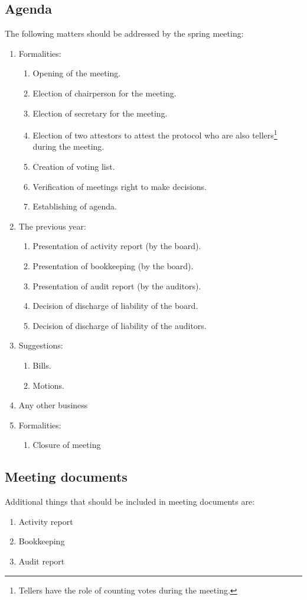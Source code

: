 \subsection{Agenda}
The following matters should be addressed by the spring meeting:
\begin{enumerate}
  \item Formalities:
  \begin{enumerate}
    \item Opening of the meeting.
    \item Election of chairperson for the meeting.
    \item Election of secretary for the meeting.
    \item Election of two attestors to attest the protocol who are also tellers\footnote{Tellers have the role of counting votes during the meeting.} during the meeting.
    \item Creation of voting list.
    \item Verification of meetings right to make decisions.
    \item Establishing of agenda.
  \end{enumerate}
  \item The previous year:
  \begin{enumerate}
    \item Presentation of activity report (by the board).
    \item Presentation of bookkeeping (by the board).
    \item Presentation of audit report (by the auditors). 
    \item Decision of discharge of liability of the board.
    \item Decision of discharge of liability of the auditors. 
  \end{enumerate}
  \item Suggestions:
  \begin{enumerate}
    \item Bills.
    \item Motions.
  \end{enumerate}
  \item Any other business
  \item Formalities:
  \begin{enumerate}
    \item Closure of meeting
  \end{enumerate}
\end{enumerate}

\subsection{Meeting documents}
Additional things that should be included in meeting documents are:
\begin{enumerate}
  \item Activity report
  \item Bookkeeping
  \item Audit report
\end{enumerate}

